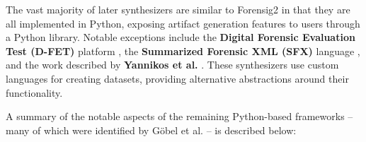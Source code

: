\documentclass[final,5p,times,twocolumn]{elsarticle}
\begin{document}
The vast majority of later synthesizers are similar to Forensig2 in that
they are all implemented in Python, exposing artifact generation
features to users through a Python library. Notable exceptions include
the \textbf{Digital Forensic Evaluation Test (D-FET)} platform
\citep{williamCloudbasedDigitalForensics2011}, the \textbf{Summarized
Forensic XML (SFX)} language
\citep{russellForensicImageDescription2012}, and the work described
by \textbf{Yannikos et al.} \citep{yannikosDataCorporaDigital2014}.
These synthesizers use custom languages for creating datasets, providing
alternative abstractions around their functionality.

A summary of the notable aspects of the remaining Python-based
frameworks -- many of which were identified by Göbel et al.
\citep{gobelForTraceHolisticForensic2022} -- is described below:
\end{document}
